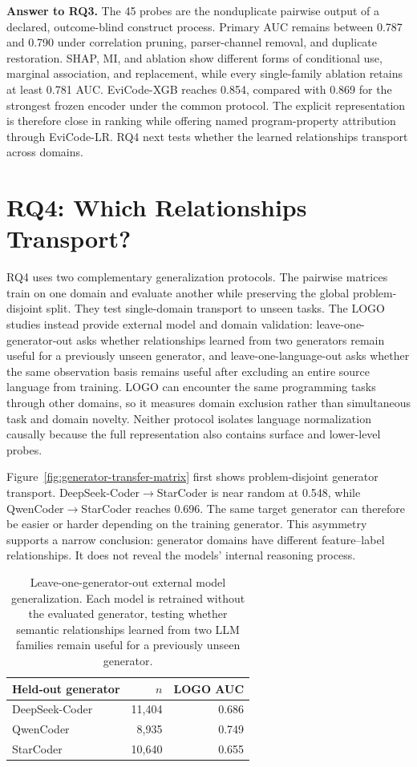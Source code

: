 \documentclass[conference]{IEEEtran}
\begin{document}
\textbf{Answer to RQ3.} The 45 probes are the nonduplicate pairwise output of a declared, outcome-blind construct process. Primary AUC remains between 0.787 and 0.790 under correlation pruning, parser-channel removal, and duplicate restoration. SHAP, MI, and ablation show different forms of conditional use, marginal association, and replacement, while every single-family ablation retains at least 0.781 AUC. EviCode-XGB reaches 0.854, compared with 0.869 for the strongest frozen encoder under the common protocol. The explicit representation is therefore close in ranking while offering named program-property attribution through EviCode-LR. RQ4 next tests whether the learned relationships transport across domains.

\FloatBarrier
\section{RQ4: Which Relationships Transport?}
\label{sec:rq4}
RQ4 uses two complementary generalization protocols. The pairwise matrices train on one domain and evaluate another while preserving the global problem-disjoint split. They test single-domain transport to unseen tasks. The LOGO studies instead provide external model and domain validation: leave-one-generator-out asks whether relationships learned from two generators remain useful for a previously unseen generator, and leave-one-language-out asks whether the same observation basis remains useful after excluding an entire source language from training. LOGO can encounter the same programming tasks through other domains, so it measures domain exclusion rather than simultaneous task and domain novelty. Neither protocol isolates language normalization causally because the full representation also contains surface and lower-level probes.

Figure~\ref{fig:generator-transfer-matrix} first shows problem-disjoint generator transport. DeepSeek-Coder$\rightarrow$StarCoder is near random at 0.548, while QwenCoder$\rightarrow$StarCoder reaches 0.696. The same target generator can therefore be easier or harder depending on the training generator. This asymmetry supports a narrow conclusion: generator domains have different feature--label relationships. It does not reveal the models' internal reasoning process.

\begin{table}[t]
\centering
\caption{Leave-one-generator-out external model generalization. Each model is retrained without the evaluated generator, testing whether semantic relationships learned from two LLM families remain useful for a previously unseen generator.}
\label{tab:generator}
\begin{tabular}{@{}lrr@{}}
\toprule
Held-out generator & $n$ & LOGO AUC \\
\midrule
DeepSeek-Coder & 11,404 & 0.686 \\
QwenCoder & 8,935 & 0.749 \\
StarCoder & 10,640 & 0.655 \\
\bottomrule
\end{tabular}
\end{table}
\end{document}
